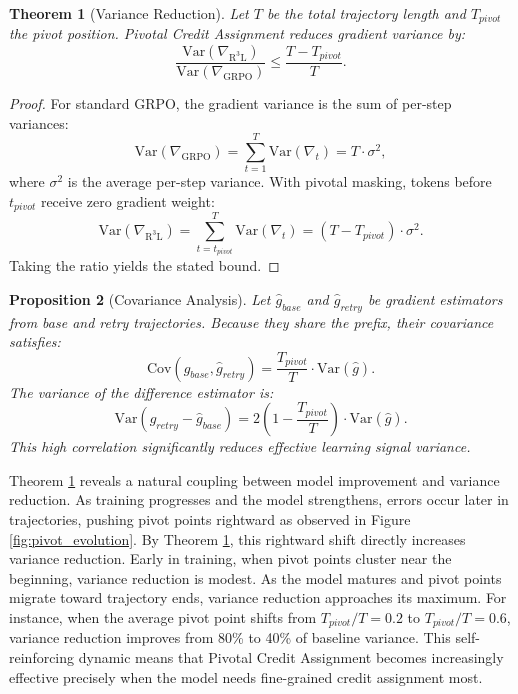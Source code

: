 \documentclass[11pt]{article}
\newtheorem{theorem}{Theorem}
\newtheorem{proposition}[theorem]{Proposition}
\theoremstyle{definition}
\theoremstyle{remark}
\begin{document}
\begin{theorem}[Variance Reduction]
\label{thm:variance_reduction}
Let $T$ be the total trajectory length and $T_{pivot}$ the pivot position. Pivotal Credit Assignment reduces gradient variance by:
\begin{equation}
\frac{\mathrm{Var}(\nabla_{\mathrm{R^3L}})}{\mathrm{Var}(\nabla_{\mathrm{GRPO}})} \leq \frac{T - T_{pivot}}{T}.
\end{equation}
\end{theorem}

\begin{proof}
For standard GRPO, the gradient variance is the sum of per-step variances:
\begin{equation}
\mathrm{Var}(\nabla_{\text{GRPO}}) = \sum_{t=1}^{T} \mathrm{Var}(\nabla_t) = T \cdot \sigma^2,
\end{equation}
where $\sigma^2$ is the average per-step variance. With pivotal masking, tokens before $t_{pivot}$ receive zero gradient weight:
\begin{equation}
\mathrm{Var}(\nabla_{\mathrm{R^3L}}) =\sum_{t=t_{pivot}}^{T} \mathrm{Var}(\nabla_t) = (T - T_{pivot}) \cdot \sigma^2.
\end{equation}
Taking the ratio yields the stated bound.
\end{proof}

\begin{proposition}[Covariance Analysis]
\label{prop:covariance}
Let $\hat{g}_{base}$ and $\hat{g}_{retry}$ be gradient estimators from base and retry trajectories. Because they share the prefix, their covariance satisfies:
\begin{equation}
\mathrm{Cov}(\hat{g}_{base}, \hat{g}_{retry}) = \frac{T_{pivot}}{T} \cdot \mathrm{Var}(\hat{g}).
\end{equation}
The variance of the difference estimator is:
\begin{equation}
\mathrm{Var}(\hat{g}_{retry} - \hat{g}_{base}) = 2\left(1 - \frac{T_{pivot}}{T}\right) \cdot \mathrm{Var}(\hat{g}).
\end{equation}
This high correlation significantly reduces effective learning signal variance.
\end{proposition}

Theorem \ref{thm:variance_reduction} reveals a natural coupling between model improvement and variance reduction. As training progresses and the model strengthens, errors occur later in trajectories, pushing pivot points rightward as observed in Figure \ref{fig:pivot_evolution}. By Theorem \ref{thm:variance_reduction}, this rightward shift directly increases variance reduction. Early in training, when pivot points cluster near the beginning, variance reduction is modest. As the model matures and pivot points migrate toward trajectory ends, variance reduction approaches its maximum. For instance, when the average pivot point shifts from $T_{pivot}/T = 0.2$ to $T_{pivot}/T = 0.6$, variance reduction improves from 80\% to 40\% of baseline variance. This self-reinforcing dynamic means that Pivotal Credit Assignment becomes increasingly effective precisely when the model needs fine-grained credit assignment most.
\end{document}
